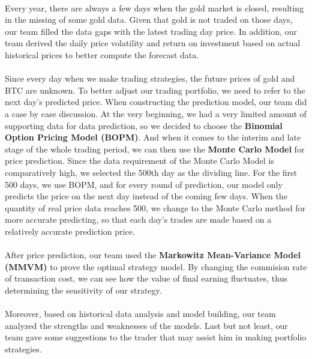\documentclass[12pt]{article}
\begin{document}
\paragraph{} 
Every year, there are always a few days when the gold market is closed, resulting in the missing of some gold data. Given that gold is not traded on those days, our team filled the data gaps with the latest trading day price. In addition, our team derived the daily price volatility and return on investment based on actual historical prices to better compute the forecast data.

\paragraph{}
Since every day when we make trading strategies, the future prices of gold and BTC are unknown. To better adjust our trading portfolio, we need to refer to the next day’s predicted price. When constructing the prediction model, our team did a case by case discussion. At the very beginning, we had a very limited amount of supporting data for data prediction, so we decided to choose the \textbf{Binomial Option Pricing Model (BOPM)}. And when it comes to the interim and late stage of the whole trading period, we can then use the \textbf{Monte Carlo Model} for price prediction. Since the data requirement of the Monte Carlo Model is comparatively high, we selected the 500th day as the dividing line. For the first 500 days, we use BOPM, and for every round of prediction, our model only predicts the price on the next day instead of the coming few days. When the quantity of real price data reaches 500, we change to the Monte Carlo method for more accurate predicting, so that each day's trades are made based on a relatively accurate prediction price.

\paragraph{}
After price prediction, our team used the \textbf{Markowitz Mean-Variance Model (MMVM)} to prove the optimal  strategy model. By changing the commision rate of transaction cost, we can see how the value of final earning fluctuates, thus determining the sensitivity of our strategy. 

\paragraph{}
Moreover, based on historical data analysis and model building, our team analyzed the strengths and weaknesses of the models. Last but not least, our team gave some suggestions to the trader that may assist him in making portfolio strategies.
\end{document}
